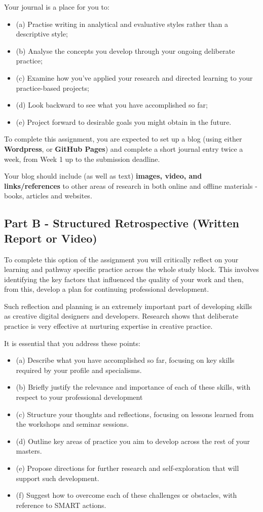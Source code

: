 \documentclass{../../fal_assignment}
\begin{document}
Your journal is a place for you to:
\begin{itemize}
	\item (a) Practise writing in analytical and evaluative styles rather than a descriptive style;
	\item (b) Analyse the concepts you develop through your ongoing deliberate practice;
	\item (c) Examine how you’ve applied your research and directed learning to your practice-based projects;
	\item (d) Look backward to see what you have accomplished so far;
	\item (e) Project forward to desirable goals you might obtain in the future.
\end{itemize}

To complete this assignment, you are expected to set up a blog (using either \textbf{Wordpress}, or \textbf{GitHub Pages}) and complete a short journal entry twice a week, from Week 1 up to the submission deadline.

Your blog should include (as well as text) \textbf{images, video, and links/references} to other areas of research in both online and offline materials - books, articles and websites.


	
\subsection*{Part B - Structured Retrospective (Written Report or Video)} 

To complete this option of the assignment you will critically reflect on your learning and pathway specific practice across the whole study block. This involves identifying the key factors that influenced the quality of your work and then, from this, develop a plan for continuing professional development.

Such reflection and planning is an extremely important part of developing skills as creative digital designers and developers. Research shows that deliberate practice is very effective at nurturing expertise in creative practice.

It is essential that you address these points:
\begin{itemize}
\item(a) Describe what you have accomplished so far, focusing on key skills required by your profile and specialisms.
\item (b) Briefly justify the relevance and importance of each of these skills, with respect to your professional development
\item(c) Structure your thoughts and reflections, focusing on lessons learned from the workshops and seminar sessions.
\item(d) Outline key areas of practice you aim to develop across the rest of your masters.
\item(e) Propose directions for further research and self-exploration that will support such development.
\item (f) Suggest how to overcome each of these challenges or obstacles, with reference to SMART actions.
\end{itemize}
\end{document}
